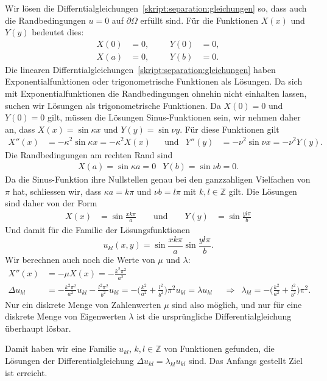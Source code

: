 Wir lösen die Differntialgleichungen~\eqref{skript:separation:gleichungen}
so, dass auch die Randbedingungen $u=0$ auf $\partial\Omega$ erfüllt sind.
Für die Funktionen $X(x)$ und $Y(y)$ bedeutet dies:
\[
\begin{aligned}
X(0)&=0,&&& Y(0) &= 0,\\
X(a)&=0,&&& Y(b) &= 0.
\end{aligned}
\]
Die linearen Differntialgleichungen~\eqref{skript:separation:gleichungen}
haben Exponentialfunktionen oder trigonometrische Funktionen als
Lösungen.
Da sich mit Exponentialfunktionen die Randbedingungen ohnehin nicht
einhalten lassen, suchen wir Lösungen als trigonometrische Funktionen.
Da $X(0)=0$ und $Y(0)=0$ gilt, müssen die Lösungen Sinus-Funktionen sein,
wir nehmen daher an, dass $X(x)=\sin \kappa x$ und $Y(y)=\sin \nu y$.
Für diese Funktionen gilt
\[
\begin{aligned}
X''(x) &= -\kappa^2\sin \kappa x = -\kappa^2 X(x)
&&\text{und}&
Y''(y) &= -\nu^2\sin \nu x = -\nu^2 Y(y).
\end{aligned}
\]
Die Randbedingungen am rechten Rand sind
\[
\begin{aligned}
X(a) = \sin \kappa a = 0
&
Y(b) = \sin \nu b = 0.
\end{aligned}
\]
Da die Sinus-Funktion ihre Nullstellen genau bei den ganzzahligen Vielfachen
von $\pi$ hat, schliessen wir, dass $\kappa a = k\pi$ und $\nu b = l\pi$
mit $k,l\in\mathbb Z$ gilt.
Die Lösungen sind daher von der Form
\[
\begin{aligned}
X(x) &= \sin \frac{xk\pi}{a}
\qquad \text{und} \qquad
Y(y) &= \sin\frac{yl\pi}{b}
\end{aligned}
\]
Und damit für die Familie der Lösungsfunktionen
\[
u_{kl}(x,y) = \sin \frac{xk\pi}{a} \sin\frac{yl\pi}{b}.
\]
Wir berechnen auch noch die Werte von $\mu$ und $\lambda$:
\begin{align*}
X''(x)
&=
-\mu X(x) = -\frac{k^2\pi^2}{a^2}
\\
\Delta u_{kl}
&=
-\frac{k^2\pi^2}{a^2} u_{kl}
-\frac{l^2\pi^2}{b^2} u_{kl}
=
-\biggl(\frac{k^2}{a^2}+\frac{l^2}{b^2}\biggr)\pi^2 u_{kl}
=
\lambda  u_{kl}
&&\Rightarrow&
\lambda_{kl} = - \biggl(\frac{k^2}{a^2}+\frac{l^2}{b^2}\biggr)\pi^2.
\end{align*}
Nur ein diskrete Menge von Zahlenwerten $\mu$ sind also möglich, und nur 
für eine diskrete Menge von Eigenwerten $\lambda$ ist die ursprüngliche 
Differentialgleichung überhaupt lösbar.

Damit haben wir eine Familie $u_{kl}$, $k,l\in\mathbb Z$ von Funktionen
gefunden, die Lösungen der Differentialgleichung
$\Delta u_{kl}=\lambda_{kl} u_{kl}$ sind.
Das Anfangs gestellt Ziel ist erreicht.

